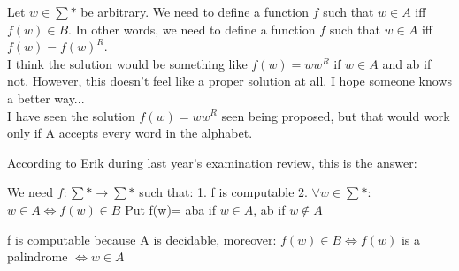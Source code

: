 \documentclass{article}
\begin{document}
Let $w \in \sum*$ be arbitrary. We need to define a function $f$ such that $w \in A$ iff $f(w) \in B$.
In other words, we need to define a function $f$ such that $w \in A$ iff $f(w) = f(w)^R$.\\
I think the solution would be something like $f(w) = ww^R$ if $w \in A$ and ab if not.
However, this doesn't feel like a proper solution at all. I hope someone knows a better way...\\
I have seen the solution $f(w) = ww^R$ seen being proposed, but that would work only if A accepts every word in the alphabet.

According to Erik during last year's examination review, this is the answer:

We need $f: \sum* \to \sum*$ such that:
1. f is computable
2. $\forall w \in \sum*$: $w \in A \iff f(w) \in B$
    Put f(w)= aba if $w \in A$, ab if $w \notin A$
    
f is computable because A is decidable, moreover:
$f(w) \in B \iff f(w)$ is a palindrome $\iff w \in A$
\end{document}
